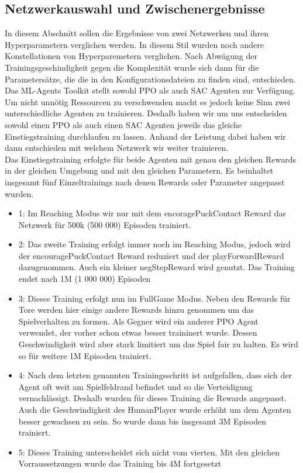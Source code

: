 \subsection{Netzwerkauswahl und Zwischenergebnisse}
\label{subsect:netzwahl_ergs}

In diesem Abschnitt sollen die Ergebnisse von zwei Netzwerken und ihren Hyperparametern verglichen werden. In diesem Stil wurden noch andere Konstellationen von Hyperparemetern verglichen. Nach Abwägung der Trainingsgeschindigkeit gegen die Komplexität wurde sich dann für die Parametersätze, die die in den Konfigurationsdateien zu finden sind, entschieden. \\
Das ML-Agents Toolkit stellt sowohl PPO als auch SAC Agenten zur Verfügung. Um nicht unnötig Ressourcen zu verschwenden macht es jedoch keine Sinn zwei unterschiedliche Agenten zu trainieren. Deshalb haben wir um uns entscheiden sowohl einen PPO als auch einen SAC Agenten jeweils das gleiche Einstiegstraining durchlaufen zu lassen. Anhand der Leistung dabei haben wir dann entschieden mit welchem Netzwerk wir weiter trainieren. \\

Das Einstiegstraining erfolgte für beide Agenten mit genau den gleichen Rewards in der gleichen Umgebung und mit den gleichen Parametern. Es beinhaltet insgesamt fünf Einzeltrainings nach denen Rewards oder Parameter angepasst wurden. 

\begin{itemize}
\item 1: Im Reaching Modus wir nur mit dem encoragePuckContact Reward das Netzwerk für 500k (500 000) Episoden trainiert. 

\item 2: Das zweite Training erfolgt immer noch im Reaching Modus, jedoch wird der encouragePuckContact Reward reduziert und der playForwardReward dazugenommen. Auch ein kleiner negStepReward wird genutzt. Das Training endet nach 1M (1 000 000) Episoden

\item 3: Dieses Training erfolgt nun im FullGame Modus. Neben den Rewards für Tore werden hier einige andere Rewards hinzu genommen um das Spielverhalten zu formen. Als Gegner wird ein anderer PPO Agent verwendet, der vorher schon etwas besser traininert wurde. Dessen Geschwindigkeit wird aber stark limitiert um das Spiel fair zu halten. Es wird so für weitere 1M Episoden trainiert.

\item 4: Nach dem letzten genannten Trainingsschritt ist aufgefallen, dass sich der Agent oft weit am Spielfeldrand befindet und so die Verteidigung vernachlässigt. Deshalb wurden für dieses Training die Rewards angepasst. Auch die Geschwindigkeit des HumanPlayer wurde erhöht um dem Agenten besser gewachsen zu sein. So wurde dann bis insgesamt 3M Episoden trainiert.

\item 5: Dieses Training unterscheidet sich nicht vom vierten. Mit den gleichen Vorraussetzungen wurde das Training bis 4M fortgesetzt
\end{itemize}

